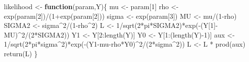 \documentclass[
  12pt,
]{book}
\newenvironment{Shaded}{\begin{snugshade}}{\end{snugshade}}
\newcommand{\ControlFlowTok}[1]{\textcolor[rgb]{0.13,0.29,0.53}{\textbf{#1}}}
\newcommand{\DecValTok}[1]{\textcolor[rgb]{0.00,0.00,0.81}{#1}}
\newcommand{\FunctionTok}[1]{\textcolor[rgb]{0.00,0.00,0.00}{#1}}
\newcommand{\NormalTok}[1]{#1}
\newcommand{\OtherTok}[1]{\textcolor[rgb]{0.56,0.35,0.01}{#1}}
\newcommand{\SpecialCharTok}[1]{\textcolor[rgb]{0.00,0.00,0.00}{#1}}
\theoremstyle{definition}
\theoremstyle{definition}
\theoremstyle{definition}
\theoremstyle{definition}
\theoremstyle{remark}
\begin{document}
\begin{Shaded}
\begin{Highlighting}[]
\NormalTok{likelihood }\OtherTok{\textless{}{-}} \ControlFlowTok{function}\NormalTok{(param,Y)\{}
\NormalTok{  mu  }\OtherTok{\textless{}{-}}\NormalTok{ param[}\DecValTok{1}\NormalTok{]}
\NormalTok{  rho }\OtherTok{\textless{}{-}} \FunctionTok{exp}\NormalTok{(param[}\DecValTok{2}\NormalTok{])}\SpecialCharTok{/}\NormalTok{(}\DecValTok{1}\SpecialCharTok{+}\FunctionTok{exp}\NormalTok{(param[}\DecValTok{2}\NormalTok{]))}
\NormalTok{  sigma }\OtherTok{\textless{}{-}} \FunctionTok{exp}\NormalTok{(param[}\DecValTok{3}\NormalTok{])}
\NormalTok{  MU }\OtherTok{\textless{}{-}}\NormalTok{ mu}\SpecialCharTok{/}\NormalTok{(}\DecValTok{1}\SpecialCharTok{{-}}\NormalTok{rho)}
\NormalTok{  SIGMA2 }\OtherTok{\textless{}{-}}\NormalTok{ sigma}\SpecialCharTok{\^{}}\DecValTok{2}\SpecialCharTok{/}\NormalTok{(}\DecValTok{1}\SpecialCharTok{{-}}\NormalTok{rho}\SpecialCharTok{\^{}}\DecValTok{2}\NormalTok{)}
\NormalTok{  L }\OtherTok{\textless{}{-}} \DecValTok{1}\SpecialCharTok{/}\FunctionTok{sqrt}\NormalTok{(}\DecValTok{2}\SpecialCharTok{*}\NormalTok{pi}\SpecialCharTok{*}\NormalTok{SIGMA2)}\SpecialCharTok{*}\FunctionTok{exp}\NormalTok{(}\SpecialCharTok{{-}}\NormalTok{(Y[}\DecValTok{1}\NormalTok{]}\SpecialCharTok{{-}}\NormalTok{MU)}\SpecialCharTok{\^{}}\DecValTok{2}\SpecialCharTok{/}\NormalTok{(}\DecValTok{2}\SpecialCharTok{*}\NormalTok{SIGMA2))}
\NormalTok{  Y1 }\OtherTok{\textless{}{-}}\NormalTok{ Y[}\DecValTok{2}\SpecialCharTok{:}\FunctionTok{length}\NormalTok{(Y)]}
\NormalTok{  Y0 }\OtherTok{\textless{}{-}}\NormalTok{ Y[}\DecValTok{1}\SpecialCharTok{:}\NormalTok{(}\FunctionTok{length}\NormalTok{(Y)}\SpecialCharTok{{-}}\DecValTok{1}\NormalTok{)]}
\NormalTok{  aux }\OtherTok{\textless{}{-}} \DecValTok{1}\SpecialCharTok{/}\FunctionTok{sqrt}\NormalTok{(}\DecValTok{2}\SpecialCharTok{*}\NormalTok{pi}\SpecialCharTok{*}\NormalTok{sigma}\SpecialCharTok{\^{}}\DecValTok{2}\NormalTok{)}\SpecialCharTok{*}\FunctionTok{exp}\NormalTok{(}\SpecialCharTok{{-}}\NormalTok{(Y1}\SpecialCharTok{{-}}\NormalTok{mu}\SpecialCharTok{{-}}\NormalTok{rho}\SpecialCharTok{*}\NormalTok{Y0)}\SpecialCharTok{\^{}}\DecValTok{2}\SpecialCharTok{/}\NormalTok{(}\DecValTok{2}\SpecialCharTok{*}\NormalTok{sigma}\SpecialCharTok{\^{}}\DecValTok{2}\NormalTok{))}
\NormalTok{  L }\OtherTok{\textless{}{-}}\NormalTok{ L }\SpecialCharTok{*} \FunctionTok{prod}\NormalTok{(aux)}
  \FunctionTok{return}\NormalTok{(L)}
\NormalTok{\}}
\end{Highlighting}
\end{Shaded}
\end{document}
